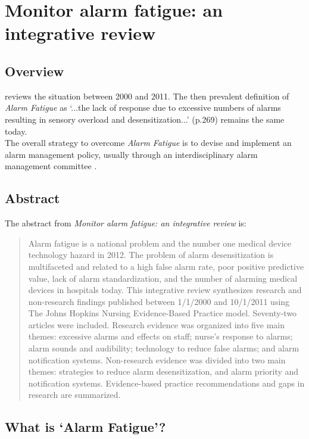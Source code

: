 \chapter{Monitor alarm fatigue: an integrative review}

\section{Overview}

\citet{cvach2012monitor} reviews the situation between 2000 and 2011. The then prevalent definition of \textit{Alarm Fatigue} as `...the lack of response due to excessive numbers of alarms resulting in sensory overload and desensitization...' (p.269) remains the same today. \\

The overall strategy to overcome \textit{Alarm Fatigue} is to devise and implement an alarm management policy, usually through an interdisciplinary alarm management committee \citep[p.273]{cvach2012monitor}.

\section{Abstract}

The abstract from \textit{Monitor alarm fatigue: an integrative review} \citep[p.268]{cvach2012monitor} is:

\begin{quotation}
	Alarm fatigue is a national problem and the number one medical device technology hazard in 2012. The problem of alarm desensitization is multifaceted and related to a high false alarm rate, poor positive predictive value, lack of alarm standardization, and the number of alarming medical devices in hospitals today. This integrative review synthesizes research and non-research findings published between 1/1/2000 and 10/1/2011 using The Johns Hopkins Nursing Evidence-Based Practice model. Seventy-two articles were included. Research evidence was organized into five main themes: excessive alarms and effects on staff; nurse's response to alarms; alarm sounds and audibility; technology to reduce false alarms; and alarm notification systems. Non-research evidence was divided into two main themes: strategies to reduce alarm desensitization, and alarm priority and notification systems. Evidence-based practice recommendations and gaps in research are summarized.
\end{quotation}

\section{What is `Alarm Fatigue'?}

